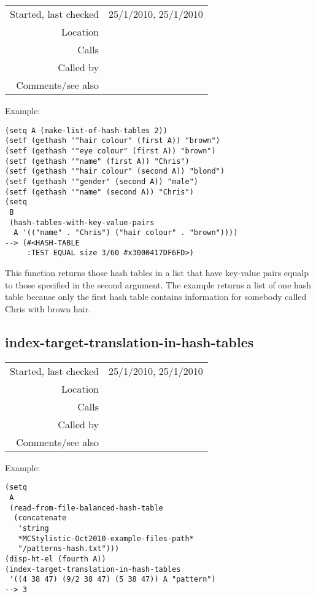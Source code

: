 \vspace{0.3cm}
\begin{tabular}{r|p{8cm}}
Started, last checked & 25/1/2010, 25/1/2010 \\
Location & \nameref{sec:hash-tables} \\
Calls & \nameref{fun:constant-vector} \\
Called by & \\
Comments/see also &
\end{tabular}

\vspace{0.5cm}
\noindent Example:
\begin{verbatim}
(setq A (make-list-of-hash-tables 2))
(setf (gethash '"hair colour" (first A)) "brown")
(setf (gethash '"eye colour" (first A)) "brown")
(setf (gethash '"name" (first A)) "Chris")
(setf (gethash '"hair colour" (second A)) "blond")
(setf (gethash '"gender" (second A)) "male")
(setf (gethash '"name" (second A)) "Chris")
(setq
 B
 (hash-tables-with-key-value-pairs
  A '(("name" . "Chris") ("hair colour" . "brown"))))
--> (#<HASH-TABLE
     :TEST EQUAL size 3/60 #x3000417DF6FD>)
\end{verbatim}

\noindent This function returns those hash tables in
a list that have key-value pairs equalp to those
specified in the second argument. The example returns
a list of one hash table because only the first hash
table contains information for somebody called Chris
with brown hair.


\subsection*{index-target-translation-in-hash-tables}\label{fun:index-target-translation-in-hash-tables}

\vspace{0.3cm}
\begin{tabular}{r|p{8cm}}
Started, last checked & 25/1/2010, 25/1/2010 \\
Location & \nameref{sec:hash-tables} \\
Calls & \nameref{fun:test-translation} \\
Called by & \\
Comments/see also &
\end{tabular}

\vspace{0.5cm}
\noindent Example:
\begin{verbatim}
(setq
 A
 (read-from-file-balanced-hash-table
  (concatenate
   'string
   *MCStylistic-Oct2010-example-files-path*
   "/patterns-hash.txt")))
(disp-ht-el (fourth A))
(index-target-translation-in-hash-tables
 '((4 38 47) (9/2 38 47) (5 38 47)) A "pattern")
--> 3
\end{verbatim}

